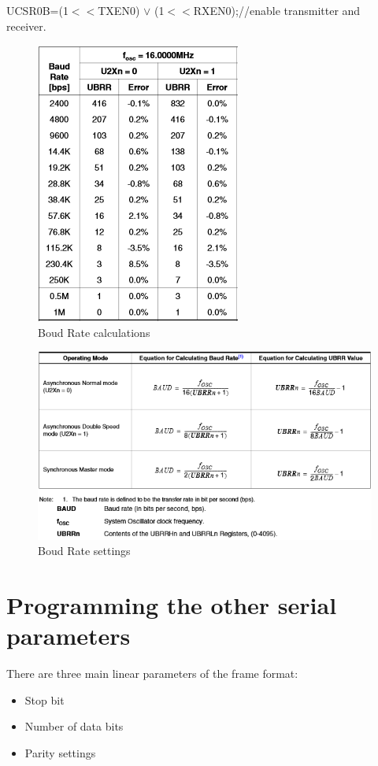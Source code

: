 \documentclass[english]{article}
\begin{document}
UCSR0B=(1$<<$TXEN0) $\vee$ (1$<<$RXEN0);//enable transmitter and receiver.

\begin{figure}[H]
  \centering
  \includegraphics[scale=0.8]{MicroLab4/boundRate}
  \caption{ Boud Rate calculations} \label{tab:UCSZ} 
\end{figure}
\begin{figure}[H]
  \centering
  \includegraphics[scale=0.8]{MicroLab4/boundRateCalculations}
  \caption{Boud Rate settings} \label{tab:UCSZ} 
\end{figure}
\section{Programming the other serial parameters}
There are three main linear parameters of the frame format:
\begin{itemize}
\item Stop bit
\item Number of data bits
\item Parity settings
\end{itemize}
\end{document}
